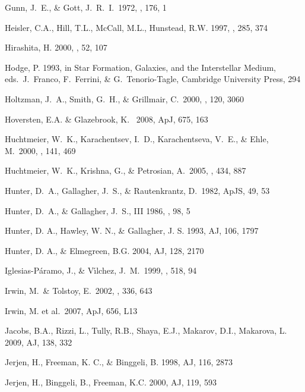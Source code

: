 \documentclass[12pt,onecolumn]{emulateapj}
\begin{document}
\begin{thebibliography}{}
Gunn, J.~E., \& Gott, J.~R.~I.\ 1972, \apj, 176, 1 

Heisler, C.A., Hill, T.L., McCall, M.L., Hunstead, R.W. 1997, \mnras , 285, 374

Hirashita, H. 2000, \pasj , 52, 107

Hodge, P. 1993, in Star Formation, Galaxies, and the Interstellar Medium,
   eds.\ J.\ Franco, F.\ Ferrini, \& G.\ Tenorio-Tagle, Cambridge University 
   Press, 294

Holtzman, J.~A., Smith, G.~H., \& Grillmair, C.\ 2000, \aj, 120, 3060 

Hoversten, E.A. \& Glazebrook, K. \ 2008, ApJ, 675, 163 

Huchtmeier, W.~K., Karachentsev, I.~D., Karachentseva, V.~E., \& 
   Ehle, M.\ 2000, \aaps, 141, 469 

Huchtmeier, W.~K., Krishna, G., \& Petrosian, A.\ 2005, \aap, 434, 887 

Hunter, D.~A., Gallagher, J.~S., \& Rautenkrantz, D.\ 1982, ApJS, 49, 53

Hunter, D.~A., \& Gallagher, J.~S., III 1986, \pasp, 98, 5 

Hunter, D. A., Hawley, W. N., \& Gallagher, J. S. 1993, AJ, 106, 1797

Hunter, D. A., \& Elmegreen, B.G. 2004, AJ, 128, 2170

Iglesias-P{\'a}ramo, J., \& V{\'{\i}}lchez, J.~M.\ 1999, \apj, 518, 94 

Irwin, M.~\& Tolstoy, E.\ 2002, \mnras, 336, 643 

Irwin, M. et al.\ 2007, ApJ, 656, L13 

Jacobs, B.A., Rizzi, L., Tully, R.B., Shaya, E.J., Makarov, D.I., Makarova, L. 2009, AJ, 138, 332
 
Jerjen, H., Freeman, K. C., \& Binggeli, B. 1998, AJ, 116, 2873

Jerjen, H., Binggeli, B., Freeman, K.C. 2000, AJ, 119, 593 


\end{thebibliography}
\end{document}
